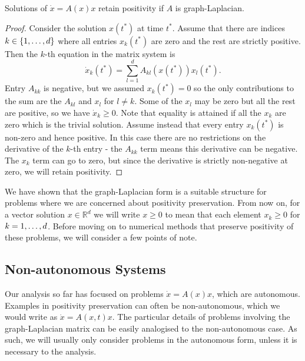 \begin{theorem}
    \label{thm:posgl}
    Solutions of $\dot{x} = A(x)x$ retain positivity if $A$ is graph-Laplacian.
\end{theorem}
\begin{proof}
    Consider the solution $x(t^*)$ at time $t^*$. Assume that there are indices $k \in \{1,\mathellipsis, d\}$ where all entries $x_k(t^*)$ are zero and the rest are strictly positive.
    Then the $k$-th equation in the matrix system is
    \begin{equation*}
        \dot{x}_k(t^*) = \sum_{l = 1}^{d} A_{kl}(x(t^*))x_l(t^*).
    \end{equation*}
    Entry $A_{kk}$ is negative, but we assumed $x_k(t^*)=0$ so the only contributions to the sum are the $A_{kl}$ and $x_l$ for $l \ne k$.
    Some of the $x_l$ may be zero but all the rest are positive, so we have $\dot{x}_k \ge 0$.
    Note that equality is attained if all the $x_k$ are zero which is the trivial solution. 
    Assume instead that every entry $x_k(t^*)$ is non-zero and hence positive.
    In this case there are no restrictions on the derivative of the $k$-th entry - the $A_{kk}$ term means this derivative can be negative.
    The $x_k$ term can go to zero, but since the derivative is strictly non-negative at zero, we will retain positivity.
\end{proof}

We have shown that the graph-Laplacian form is a suitable structure for problems where we are concerned about positivity preservation.
From now on, for a vector solution $x \in \mathds{R}^d$ we will write $x \ge 0$ to mean that each element $x_k \ge 0$ for $k = 1, \mathellipsis, d$.
Before moving on to numerical methods that preserve positivity of these problems, we will consider a few points of note.

\subsection{Non-autonomous Systems}

Our analysis so far has focused on problems $\dot{x} = A(x)x$, which are autonomous.
Examples in positivity preservation can often be non-autonomous, which we would write as $\dot{x} = A(x,t)x$.
The particular details of problems involving the graph-Laplacian matrix can be easily analogised to the non-autonomous case.
As such, we will usually only consider problems in the autonomous form, unless it is necessary to the analysis.

